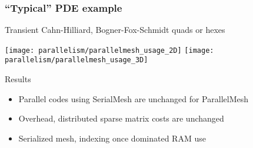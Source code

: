 \begin{frame}
\frametitle{``Typical'' PDE example}

Transient Cahn-Hilliard, Bogner-Fox-Schmidt quads or hexes

  \texttt{[image: parallelism/parallelmesh\_usage\_2D]}
  \texttt{[image: parallelism/parallelmesh\_usage\_3D]}

\begin{block}{Results}
\begin{itemize}
\item Parallel codes using SerialMesh are unchanged for ParallelMesh
\item Overhead, distributed sparse matrix costs are unchanged
\item Serialized mesh, indexing once dominated RAM use
\end{itemize}
\end{block}
\end{frame}
